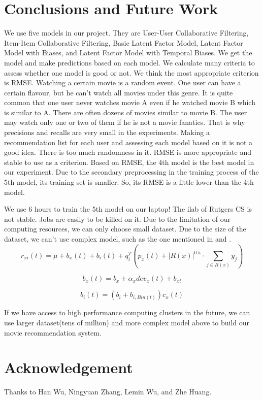\documentclass[sigconf]{acmart}
\begin{document}
\section{Conclusions and Future Work}\label{sec:conclusions}
We use five models in our project. They are User-User Collaborative Filtering, Item-Item Collaborative Filtering, Basic Latent Factor Model, Latent Factor Model with Biases, and Latent Factor Model with Temporal Biases. We get the model and make predictions based on each model. We calculate many criteria to assess whether one model is good or not. We think the most appropriate criterion is RMSE. Watching a certain movie is a random event. One user can have a certain flavour, but he can't watch all movies under this genre. It is quite common that one user never watches movie A even if he watched movie B which is similar to A. There are often dozens of movies similar to movie B. The user may watch only one or two of them if he is not a movie fanatics. That is why precisions and recalls are very small in the experiments. Making a recommendation list for each user and assessing each model based on it is not a good idea. There is too much randomness in it. RMSE is more appropriate and stable to use as a criterion. Based on RMSE, the 4th model is the best model in our experiment. Due to the secondary preprocessing in the training process of the 5th model, its training set is smaller. So, its RMSE is a little lower than the 4th model.

We use 6 hours to train the 5th model on our laptop! The ilab of Rutgers CS is not stable. Jobs are easily to be killed on it. Due to the limitation of our computing resources, we can only choose small dataset. Due to the size of the dataset, we can't use complex model, such as the one mentioned in \cite{cf-temporal} and \cite{Koren-2008}.
\begin{equation}
    r_{xi}(t) = \mu + b_x(t) + b_i(t) + q_i^T(p_x(t) + |R(x)|^{0.5} \cdot \sum_{j \in R(x)}y_j)
\end{equation}

\begin{equation}
    b_x(t) = b_x + \alpha_x dev_x(t) + b_{xt}
\end{equation}

\begin{equation}
    b_i(t) = (b_i + b_{i,Bin(t)})c_x(t)
\end{equation}

If we have access to high performance computing clusters in the future, we can use larger dataset(tens of million) and more complex model above to build our movie recommendation system.

\section*{Acknowledgement}
Thanks to Han Wu, Ningyuan Zhang, Lemin Wu, and Zhe Huang.


\balance

\end{document}
